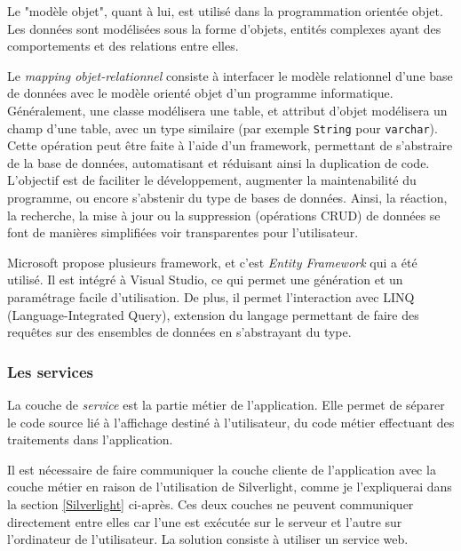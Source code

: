 Le "modèle objet", quant à lui, est utilisé dans la programmation orientée objet.
Les données sont modélisées sous la forme d'objets, entités complexes ayant des comportements et des relations entre elles.

Le \textit{mapping objet-relationnel} consiste à interfacer le modèle relationnel d'une base de données avec le modèle orienté objet d'un programme informatique.
Généralement, une classe modélisera une table, et attribut d'objet modélisera un champ d'une table, avec un type similaire (par exemple \lstinline{String} pour \lstinline{varchar}).
\\

Cette opération peut être faite à l'aide d'un framework, permettant de s'abstraire de la base de données, automatisant et réduisant ainsi la duplication de code.
L'objectif est de faciliter le développement, augmenter la maintenabilité du programme, ou encore s'abstenir du type de bases de données.
Ainsi, la réaction, la recherche, la mise à jour ou la suppression (opérations CRUD) de données se font de manières simplifiées voir transparentes pour l'utilisateur.

Microsoft propose plusieurs framework, et c'est \textit{Entity Framework} qui a été utilisé.
Il est intégré à Visual Studio, ce qui permet une génération et un paramétrage facile d'utilisation.
De plus, il permet l'interaction avec  LINQ (Language-Integrated Query), extension du langage permettant de faire des requêtes sur des ensembles de données en s'abstrayant du type.


\subsubsection{Les services}

La couche de \textit{service} est la partie métier de l'application.
Elle permet de séparer le code source lié à l'affichage destiné à l'utilisateur, du code métier effectuant des traitements dans l'application.



Il est nécessaire de faire communiquer la couche cliente de l'application avec la couche métier en raison de l'utilisation de Silverlight, comme je l'expliquerai dans la section \ref{Silverlight} ci-après.
Ces deux couches ne peuvent communiquer directement entre elles car l'une est exécutée sur le serveur et l'autre sur l'ordinateur de l'utilisateur.
La solution consiste à utiliser un service web.
\\

